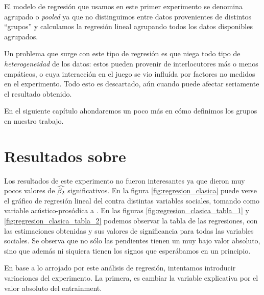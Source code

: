 El modelo de regresión que usamos en este primer experimento se denomina agrupado o \emph{pooled} ya que no distinguimos entre datos provenientes de distintos ``grupos'' \cite{gujarati1999} y calculamos la regresión lineal agrupando todos los datos disponibles agrupados.

Un problema que surge con este tipo de regresión es que niega todo tipo de \emph{heterogeneidad} de los datos: estos pueden provenir de interlocutores más o menos empáticos, o cuya interacción en el juego se vio influída por factores no medidos en el experimento. Todo esto es descartado, aún cuando puede afectar seriamente  el resultado obtenido.

En el siguiente capítulo ahondaremos un poco más en cómo definimos los grupos en nuestro trabajo.

\section{Resultados sobre \entrainment}

Los resultados de este experimento no fueron interesantes ya que dieron muy pocos valores de $\widehat{\beta_2}$ significativos. En la figura \ref{fig:regresion_clasica} puede verse el gráfico de regresión lineal del \entrainment contra distintas variables sociales, tomando como variable acústico-prosódica a \FOMEAN. En las figuras \ref{fig:regresion_clasica_tabla_1} y \ref{fig:regresion_clasica_tabla_2} podemos observar la tabla de las regresiones, con las estimaciones obtenidas y sus valores de significancia para todas las variables sociales. Se observa que no sólo las pendientes tienen un muy bajo valor absoluto, sino que además ni siquiera tienen los signos que esperábamos en un principio.

En base a lo arrojado por este análisis de regresión, intentamos introducir variaciones del experimento. La primera, es cambiar la variable explicativa por el valor absoluto del entrainment.



